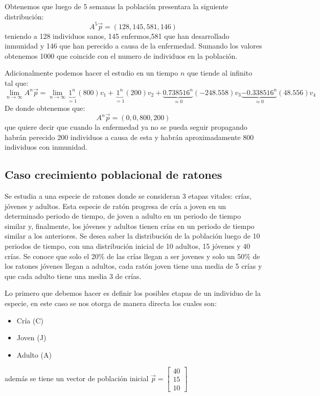 Obtenemos que luego de 5 semanas la población presentara la siguiente distribución:
\[
    A^5\vec{p} = (128,145,581,146)
\]
 teniendo a 128 individuos sanos, 145 enfermos,581 que han desarrollado inmunidad y 146 que han perecido a causa de la enfermedad. Sumando los valores obtenemos 1000 que coincide con el numero de individuos en la población.

 Adicionalmente podemos hacer el estudio en un tiempo $n$ que tiende al infinito tal que:
\[
    \lim_{n \to \infty}A^n\vec{p} = \lim_{n \to \infty} \underbrace{1^n}_{=1}(800)v_1 + \underbrace{1^n}_{=1}(200)v_2 + \underbrace{0.738516^n}_{\approx 0}(-248.558)v_3 \underbrace{-0.338516^n}_{\approx 0}(48.556)v_4
\]
De donde obtenemos que:
\[
    A^n\vec{p} = (0,0,800,200)
\]
que quiere decir que cuando la enfermedad ya no se pueda seguir propagando habrán perecido 200 individuos a causa de esta y habrán aproximadamente 800 individuos con inmunidad.
 
\subsection{Caso crecimiento poblacional de ratones}
Se estudia a una especie de ratones donde se consideran 3 etapas vitales: crías, jóvenes y adultos. Esta especie de ratón progresa de cría a joven en un determinado periodo de tiempo, de joven a adulto en un periodo de tiempo similar y, finalmente, los jóvenes y adultos tienen crías en un periodo de tiempo similar a los anteriores. Se desea saber la distribución de la población luego de 10 periodos de tiempo, con una distribución inicial de 10 adultos, 15 jóvenes y 40 crías. Se conoce que solo el 20\% de las crías llegan a ser jovenes y solo un 50\% de los ratones jóvenes llegan a adultos, cada ratón joven tiene una media de 5 crías y que cada adulto tiene una media  3 de crías. 

Lo primero que debemos hacer es definir los posibles etapas de un individuo de la especie, en este caso se nos otorga de manera directa los cuales son:

\begin{itemize}
    \item Cría (C)
    \item Joven (J)
    \item Adulto (A)
\end{itemize}

además se tiene un vector de población inicial $\vec{p} = \left[ \begin{array}{c}
    40 \\
    15 \\
    10
\end{array} \right] $

